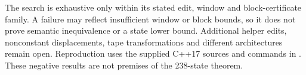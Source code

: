 The search is exhaustive only within its stated edit, window and block-certificate family. A failure may reflect insufficient window or block bounds, so it does not prove semantic inequivalence or a state lower bound. Additional helper edits, nonconstant displacements, tape transformations and different architectures remain open. Reproduction uses the supplied C++17 sources and commands in . These negative results are not premises of the 238-state theorem.
